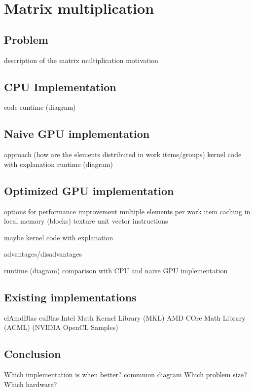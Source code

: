 \section{Matrix multiplication}

\subsection{Problem}
description of the matrix multiplication
motivation

\subsection{CPU Implementation}
code
runtime (diagram)

\subsection{Naive GPU implementation}
approach (how are the elements distributed in work items/groups)
kernel code with explanation
runtime (diagram)

\subsection{Optimized GPU implementation}
options for performance improvement
multiple elements per work item
caching in local memory (blocks)
texture unit
vector instructions

maybe kernel code with explanation

advantages/disadvantages

runtime (diagram)
comparison with CPU and naive GPU implementation

\subsection{Existing implementations}
clAmdBlas
cuBlas
Intel Math Kernel Library (MKL)
AMD COre Math Library (ACML)
(NVIDIA OpenCL Samples)

\subsection{Conclusion}
Which implementation is when better?
commmon diagram
Which problem size?
Which hardware?